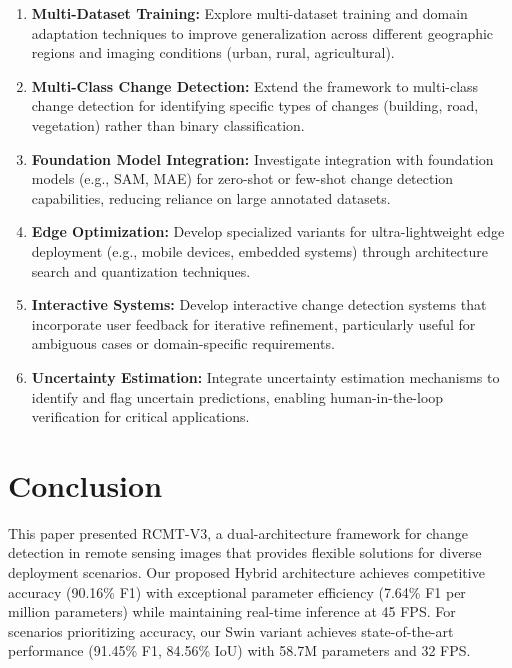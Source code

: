 \documentclass[journal]{IEEEtran}
\begin{document}
\begin{enumerate}
\item \textbf{Multi-Dataset Training:} Explore multi-dataset training and domain adaptation techniques to improve generalization across different geographic regions and imaging conditions (urban, rural, agricultural).

\item \textbf{Multi-Class Change Detection:} Extend the framework to multi-class change detection for identifying specific types of changes (building, road, vegetation) rather than binary classification.

\item \textbf{Foundation Model Integration:} Investigate integration with foundation models (e.g., SAM, MAE) for zero-shot or few-shot change detection capabilities, reducing reliance on large annotated datasets.

\item \textbf{Edge Optimization:} Develop specialized variants for ultra-lightweight edge deployment (e.g., mobile devices, embedded systems) through architecture search and quantization techniques.

\item \textbf{Interactive Systems:} Develop interactive change detection systems that incorporate user feedback for iterative refinement, particularly useful for ambiguous cases or domain-specific requirements.

\item \textbf{Uncertainty Estimation:} Integrate uncertainty estimation mechanisms to identify and flag uncertain predictions, enabling human-in-the-loop verification for critical applications.

\end{enumerate}

\section{Conclusion}

This paper presented RCMT-V3, a dual-architecture framework for change detection in remote sensing images that provides flexible solutions for diverse deployment scenarios. Our proposed Hybrid architecture achieves competitive accuracy (90.16\% F1) with exceptional parameter efficiency (7.64\% F1 per million parameters) while maintaining real-time inference at 45 FPS. For scenarios prioritizing accuracy, our Swin variant achieves state-of-the-art performance (91.45\% F1, 84.56\% IoU) with 58.7M parameters and 32 FPS.
\end{document}
